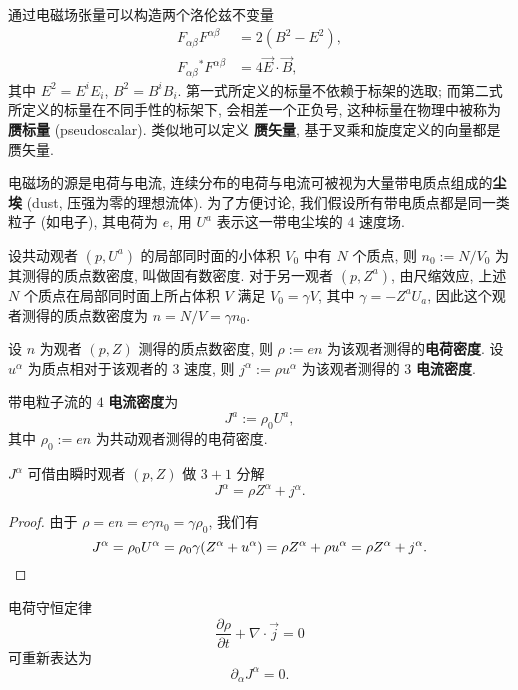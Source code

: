 \begin{remark}
    通过电磁场张量可以构造两个洛伦兹不变量
\begin{align*}
    F_{\alpha\beta}F^{\alpha\beta}&=2(B^2-E^2),\\
    F_{\alpha\beta}{}^{*}\!F^{\alpha\beta}&=4\vec{E}\cdot\vec{B},
\end{align*}
其中 $E^2=E^iE_i$, $B^2=B^iB_i$. 第一式所定义的标量不依赖于标架的选取; 而第二式所定义的标量在不同手性的标架下, 会相差一个正负号, 这种标量在物理中被称为{\bf 赝标量} (pseudoscalar). 类似地可以定义 {\bf 赝矢量}, 基于叉乘和旋度定义的向量都是赝矢量.
\end{remark}

电磁场的源是电荷与电流, 连续分布的电荷与电流可被视为大量带电质点组成的{\bf 尘埃} (dust, 压强为零的理想流体). 为了方便讨论, 我们假设所有带电质点都是同一类粒子 (如电子), 其电荷为 $ e $, 用 $ U^a $ 表示这一带电尘埃的 $ 4 $ 速度场. 

设共动观者 $ (p,U^a) $ 的局部同时面的小体积 $ V_0 $ 中有 $ N $ 个质点, 则 $ n_0:=N/V_0 $ 为其测得的质点数密度, 叫做固有数密度. 对于另一观者 $ (p,Z^a) $, 由尺缩效应, 上述 $ N $ 个质点在局部同时面上所占体积 $ V $ 满足 $ V_0=\gamma V $, 其中 $ \gamma=-Z^aU_a $, 因此这个观者测得的质点数密度为 $ n=N/V=\gamma n_0 $.

\begin{definition}[电荷密度与电流密度]
    设 $ n $ 为观者 $ (p,Z) $ 测得的质点数密度, 则 $ \rho:=en $ 为该观者测得的{\bf 电荷密度}. 设 $ u^\alpha $ 为质点相对于该观者的 $ 3 $ 速度, 则 $ j^\alpha:=\rho u^\alpha $ 为该观者测得的 $ 3 $ {\bf 电流密度}.
\end{definition}
\begin{definition}[$ 4 $ 电流密度]
    带电粒子流的 $ 4 $ {\bf 电流密度}为
    \[ J^a:=\rho_0U^a, \]
    其中 $ \rho_0:=en $ 为共动观者测得的电荷密度.
\end{definition}
\begin{proposition}
    $ J^\alpha $ 可借由瞬时观者 $ (p,Z) $ 做 $ 3+1 $ 分解
    \[ J^\alpha=\rho Z^\alpha+j^\alpha. \]
\end{proposition}
\begin{proof}
    由于 $ \rho=en=e\gamma n_0=\gamma\rho_0 $, 我们有
    \[ J^\alpha=\rho_0U^\alpha=\rho_0\gamma(Z^\alpha+u^\alpha)=\rho Z^\alpha+\rho u^\alpha=\rho Z^\alpha+j^\alpha.\qedhere \]
\end{proof}
\begin{remark}
    电荷守恒定律
    \[ \frac{\partial\rho}{\partial t}+\nabla\cdot\vec{j}=0 \]
    可重新表达为 
    \[ \partial_\alpha J^\alpha=0. \]
\end{remark}

